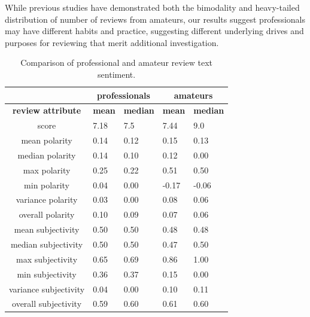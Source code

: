 \documentclass[letterpaper]{article}
\begin{document}
While previous studies have demonstrated both the bimodality and heavy-tailed distribution of number of reviews from amateurs, our results suggest professionals may have different habits and practice, suggesting different underlying drives and purposes for reviewing that merit additional investigation.

\begin{table}[tb]
\scriptsize
\begin{tabularx}{\linewidth}{|c|X|X|X|X|}
\hline  & \multicolumn{2}{|c|}{\textbf{professionals}} & \multicolumn{2}{|c|}{\textbf{amateurs}}  \\ 
\hline \textbf{review attribute} & \textbf{mean} & \textbf{median} & \textbf{mean} & \textbf{median} \\ 

\hline score & 7.18 & 7.5 & 7.44 & 9.0 \\ 

\hline mean polarity & 0.14 & 0.12 & 0.15 & 0.13 \\ 
\hline median polarity & 0.14 & 0.10 & 0.12 & 0.00 \\ 
\hline max polarity & 0.25 & 0.22 & 0.51 & 0.50 \\ 
\hline min polarity & 0.04 & 0.00 & -0.17 & -0.06 \\ 
\hline variance polarity & 0.03 & 0.00 & 0.08 & 0.06 \\ 
\hline overall polarity & 0.10 & 0.09 & 0.07 & 0.06 \\ 

\hline mean subjectivity & 0.50 & 0.50 & 0.48 & 0.48 \\ 
\hline median subjectivity & 0.50 & 0.50 & 0.47 & 0.50 \\ 
\hline max subjectivity & 0.65 & 0.69 & 0.86 & 1.00 \\ 
\hline min subjectivity & 0.36 & 0.37 & 0.15 & 0.00 \\ 
\hline variance subjectivity & 0.04 & 0.00 & 0.10 & 0.11 \\ 
\hline overall subjectivity & 0.59 & 0.60 & 0.61 & 0.60 \\ 
\hline 
\end{tabularx}
\caption{Comparison of professional and amateur review text sentiment.}
\label{tab:review_pol_subj}
\end{table}
\end{document}
